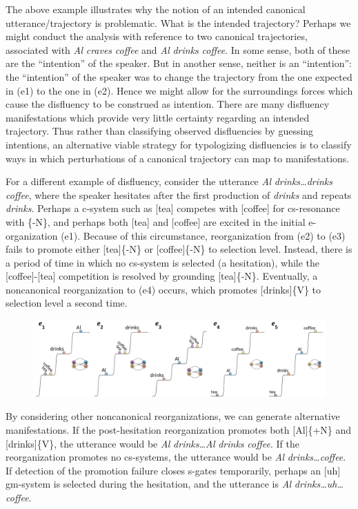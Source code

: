   The above example illustrates why the notion of an intended canonical utterance/trajectory is problematic. What is the intended trajectory? Perhaps we might conduct the analysis with reference to two canonical trajectories, associated with \textit{Al} \textit{craves} \textit{coffee} and \textit{Al} \textit{drinks} \textit{coffee}. In some sense, both of these are the “intention” of the speaker. But in another sense, neither is an “intention”: the “intention” of the speaker was to change the trajectory from the one expected in (e1) to the one in (e2). Hence we might allow for the surroundings forces which cause the disfluency to be construed as intention. There are many disfluency manifestations which provide very little certainty regarding an intended trajectory. Thus rather than classifying observed disfluencies by guessing intentions, an alternative viable strategy for typologizing disfluencies is to classify ways in which perturbations of a canonical trajectory can map to manifestations.

  For a different example of disfluency, consider the utterance \textit{Al} \textit{drinks…drinks} \textit{coffee}, where the speaker hesitates after the first production of \textit{drinks} and repeats \textit{drinks}. Perhaps a c-system such as [tea] competes with [coffee] for cs-resonance with \{-N\}, and perhaps both [tea] and [coffee] are excited in the initial e-organization (e1). Because of this circumstance, reorganization from (e2) to (e3) fails to promote either [tea]\{-N\} or [coffee]\{-N\} to selection level. Instead, there is a period of time in which no cs-system is selected (a hesitation), while the [coffee]-[tea] competition is resolved by grounding [tea]\{-N\}. Eventually, a noncanonical reorganization to (e4) occurs, which promotes [drinks]\{V\} to selection level a second time. 

  
\begin{figure}
\includegraphics[width=\textwidth]{figures/Tilsen-img61.png}
\caption{\missingcaption}
\label{fig:}
\end{figure}
 

  By considering other noncanonical reorganizations, we can generate alternative manifestations. If the post-hesitation reorganization promotes both [Al]\{+N\} and [drinks]\{V\}, the utterance would be \textit{Al} \textit{drinks…Al} \textit{drinks} \textit{coffee}. If the reorganization promotes no cs-systems, the utterance would be \textit{Al} \textit{drinks…coffee}. If detection of the promotion failure closes s-gates temporarily, perhaps an [uh] gm-system is selected during the hesitation, and the utterance is \textit{Al} \textit{drinks…uh…coffee}.

